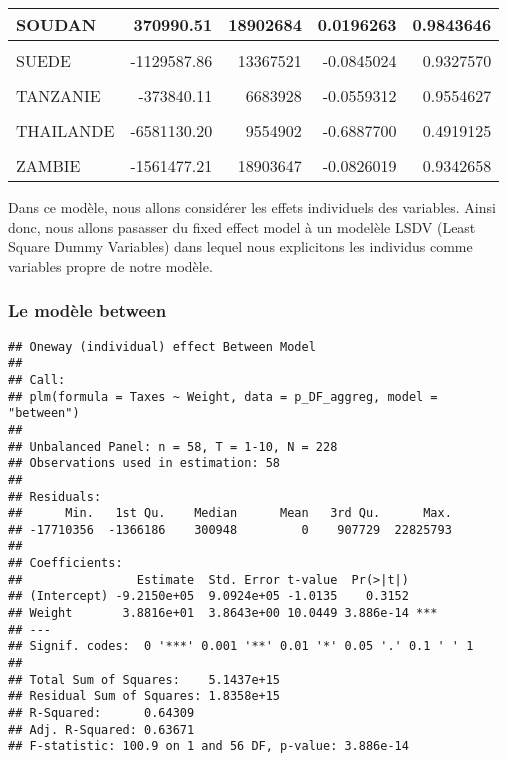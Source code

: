 \documentclass[
]{book}
\begin{document}
\begin{table}
\begin{tabular}[t]{l|r|r|r|r}
\hline
SOUDAN & 370990.51 & 18902684 & 0.0196263 & 0.9843646\\
\hline
\cellcolor{gray!6}{SUD SOUDAN} & \cellcolor{gray!6}{-3003470.69} & \cellcolor{gray!6}{18905608} & \cellcolor{gray!6}{-0.1588667} & \cellcolor{gray!6}{0.8739636}\\
\hline
SUEDE & -1129587.86 & 13367521 & -0.0845024 & 0.9327570\\
\hline
\cellcolor{gray!6}{Swaziland} & \cellcolor{gray!6}{-975538.34} & \cellcolor{gray!6}{7726665} & \cellcolor{gray!6}{-0.1262561} & \cellcolor{gray!6}{0.8996793}\\
\hline
TANZANIE & -373840.11 & 6683928 & -0.0559312 & 0.9554627\\
\hline
\cellcolor{gray!6}{TCHAD} & \cellcolor{gray!6}{127674.41} & \cellcolor{gray!6}{18902700} & \cellcolor{gray!6}{0.0067543} & \cellcolor{gray!6}{0.9946189}\\
\hline
THAILANDE & -6581130.20 & 9554902 & -0.6887700 & 0.4919125\\
\hline
\cellcolor{gray!6}{UNION EUROPEENNE} & \cellcolor{gray!6}{86341.53} & \cellcolor{gray!6}{18902832} & \cellcolor{gray!6}{0.0045677} & \cellcolor{gray!6}{0.9963609}\\
\hline
ZAMBIE & -1561477.21 & 18903647 & -0.0826019 & 0.9342658\\
\hline
\end{tabular}
\end{table}

Dans ce modèle, nous allons considérer les effets individuels des variables. Ainsi donc, nous allons pasasser du fixed effect model à un modelèle LSDV (Least Square Dummy Variables) dans lequel nous explicitons les individus comme variables propre de notre modèle.

\hypertarget{le-moduxe8le-between}{%
\subsubsection{Le modèle between}\label{le-moduxe8le-between}}

\begin{verbatim}
## Oneway (individual) effect Between Model
## 
## Call:
## plm(formula = Taxes ~ Weight, data = p_DF_aggreg, model = "between")
## 
## Unbalanced Panel: n = 58, T = 1-10, N = 228
## Observations used in estimation: 58
## 
## Residuals:
##      Min.   1st Qu.    Median      Mean   3rd Qu.      Max. 
## -17710356  -1366186    300948         0    907729  22825793 
## 
## Coefficients:
##                Estimate  Std. Error t-value  Pr(>|t|)    
## (Intercept) -9.2150e+05  9.0924e+05 -1.0135    0.3152    
## Weight       3.8816e+01  3.8643e+00 10.0449 3.886e-14 ***
## ---
## Signif. codes:  0 '***' 0.001 '**' 0.01 '*' 0.05 '.' 0.1 ' ' 1
## 
## Total Sum of Squares:    5.1437e+15
## Residual Sum of Squares: 1.8358e+15
## R-Squared:      0.64309
## Adj. R-Squared: 0.63671
## F-statistic: 100.9 on 1 and 56 DF, p-value: 3.886e-14
\end{verbatim}
\end{document}
